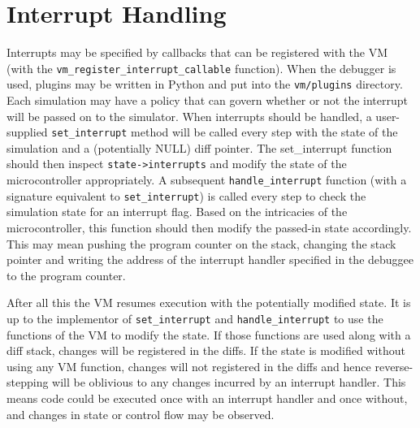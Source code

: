 \section[Interrupt Handling]{Interrupt Handling}
\begin{comment}
Interrupts in \ac{ESSIG} can occur at two different levels:

\begin{enumerate}
\item {
From outside of the VM through the vm\_interrupt method }
\item {
From a peripheral }
\end{enumerate}
\end{comment}
Interrupts may be specified by callbacks that can be registered with the VM
(with the \texttt{vm\_register\_interrupt\_callable} function). When the debugger
is used, plugins may be written in Python and put into the \texttt{vm/plugins}
directory.\\
Each simulation may have a policy that can govern whether or not the interrupt will be
passed on to the simulator. When interrupts should be handled, a user-supplied
\texttt{set\_interrupt} method will be called every step with the state of the
simulation and a (potentially NULL) diff pointer. The set\_interrupt function
should then inspect \texttt{state->interrupts} and modify the state of the
microcontroller appropriately. A subsequent \texttt{handle\_interrupt}
function (with a signature equivalent to \texttt{set\_interrupt}) is 
called every step to check the simulation state for an
interrupt flag. Based on the intricacies of the microcontroller, this function
should then modify
the passed-in state accordingly. This may mean pushing the program counter on the stack, 
changing
the stack pointer and writing the address of the interrupt handler specified
in the debuggee to the program counter.

After all this the VM resumes execution with the potentially modified state.
It is up to the implementor of \texttt{set\_interrupt} and 
\texttt{handle\_interrupt} to use the functions of the VM to modify the state.
If those functions are used along with a diff stack, changes will be
registered in the diffs. If the state is modified without using any VM
function,
changes will not registered in the diffs and hence reverse-stepping will be oblivious to
any changes incurred by an interrupt handler. This means code could be executed
once with an interrupt handler and once without, and changes in state or
control flow may be observed.

